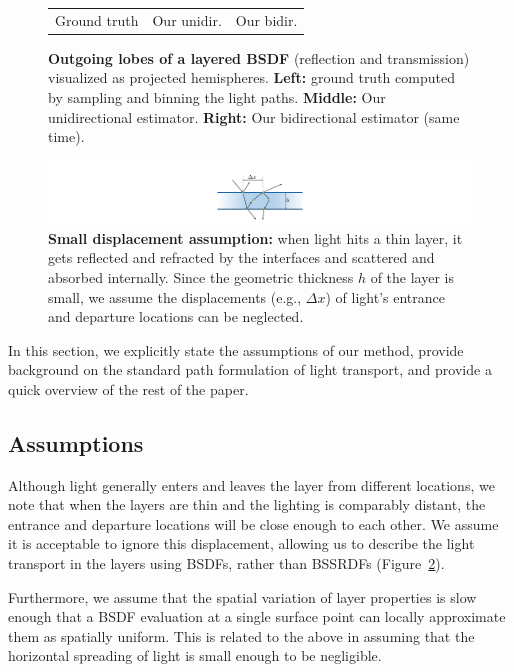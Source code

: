 \begin{figure}[t]
\begin{tabular}{ccc}
		Ground truth &
		Our unidir. &
		Our bidir. \\
	\end{tabular}
    \caption{\label{fig:hemispheres}
    	\textbf{Outgoing lobes of a layered BSDF} (reflection and transmission) visualized as projected hemispheres. \textbf{Left:} ground truth computed by sampling and binning the light paths. \textbf{Middle:} Our unidirectional estimator. \textbf{Right:} Our bidirectional estimator (same time).
    }
\end{figure}

\begin{figure}[t]
	\includegraphics[width=0.6\columnwidth]{images/illustration/assumption.pdf}
	\caption{\label{fig:thin_layer}
		\textbf{Small displacement assumption:}
		when light hits a thin layer, it gets reflected and refracted by the interfaces and scattered and absorbed internally.
		Since the geometric thickness $h$ of the layer is small, we assume the displacements (e.g., $\Delta x$) of light's entrance and departure locations can be neglected.
	}
\end{figure}

In this section, we explicitly state the assumptions of our method, provide background on the standard path formulation of light transport, and provide a quick overview of the rest of the paper.

\subsection{Assumptions}

Although light generally enters and leaves the layer from different locations, we note that when the layers are thin and the lighting is comparably distant, the entrance and departure locations will be close enough to each other. We assume it is acceptable to ignore this displacement, allowing us to describe the light transport in the layers using BSDFs, rather than BSSRDFs (Figure~\ref{fig:thin_layer}).

Furthermore, we assume that the spatial variation of layer properties is slow enough that a BSDF evaluation at a single surface point can locally approximate them as spatially uniform. This is related to the above in assuming that the horizontal spreading of light is small enough to be negligible.

